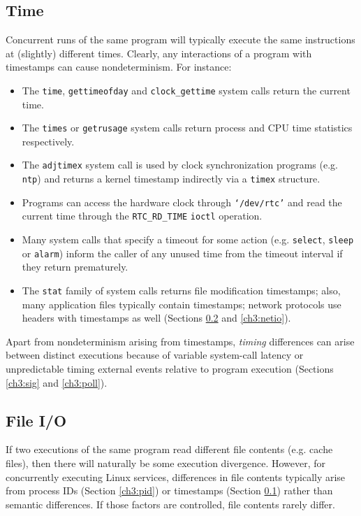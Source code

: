 \subsection{Time} \label{ch3:time}
Concurrent runs of the same program will typically
execute the same instructions at (slightly) different times.
Clearly, any interactions of a program with timestamps
can cause nondeterminism. For instance:

\begin{itemize}
\item The \texttt{time}, \texttt{gettimeofday} and \texttt{clock\_gettime}
 system calls return the current time.
\item The \texttt{times} or \texttt{getrusage} system calls
return process and CPU time statistics respectively.
\item The \texttt{adjtimex} system call is used 
by clock synchronization programs (e.g. \texttt{ntp}) 
and returns a kernel timestamp indirectly via 
a \texttt{timex} structure.
\item Programs can access the hardware clock
through \texttt{`/dev/rtc'} and read the current time
through the \texttt{RTC\_RD\_TIME} \texttt{ioctl}
operation.
\item Many system calls that specify a timeout
for some action (e.g. \texttt{select}, \texttt{sleep} or \texttt{alarm})
inform the caller of any unused time from the timeout interval if they
return prematurely.
\item The \texttt{stat} family of system calls returns file
  modification timestamps; also, many application files typically contain timestamps;
  network protocols use headers with timestamps as well (Sections \ref{ch3:fileio}
  and \ref{ch3:netio}).
\end{itemize}

Apart from nondeterminism arising
from timestamps, {\em timing} differences
can arise between distinct executions 
because of variable system-call latency 
or unpredictable timing
external events relative
to program execution (Sections \ref{ch3:sig} and \ref{ch3:poll}).

\subsection{File I/O} \label{ch3:fileio}
 \newline
If two executions of the same program read different
file contents (e.g. cache files), then
there will naturally be some execution divergence.
However, for concurrently executing Linux services,
differences in file contents typically arise
from process IDs (Section \ref{ch3:pid}) or timestamps (Section \ref{ch3:time})
rather than semantic differences.
If those factors are controlled, file contents rarely differ. \newline

